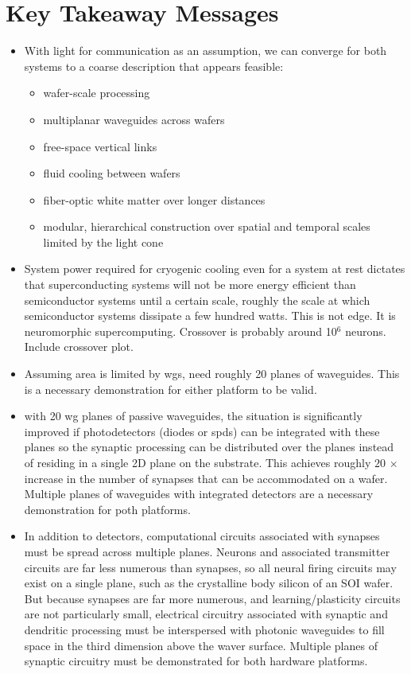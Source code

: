 \documentclass[onecolumn]{article}
\begin{document}
\section{Key Takeaway Messages}
\begin{itemize}

\item With light for communication as an assumption, we can converge for both systems to a coarse description that appears feasible:
\begin{itemize}
\item wafer-scale processing
\item multiplanar waveguides across wafers
\item free-space vertical links
\item fluid cooling between wafers
\item fiber-optic white matter over longer distances
\item modular, hierarchical construction over spatial and temporal scales limited by the light cone
\end{itemize}

\item System power required for cryogenic cooling even for a system at rest dictates that superconducting systems will not be more energy efficient than semiconductor systems until a certain scale, roughly the scale at which semiconductor systems dissipate a few hundred watts. This is not edge. It is neuromorphic supercomputing. Crossover is probably around 10$^6$ neurons. Include crossover plot.

\item Assuming area is limited by wgs, need roughly 20 planes of waveguides. This is a necessary demonstration for either platform to be valid.

\item with 20 wg planes of passive waveguides, the situation is significantly improved if photodetectors (diodes or spds) can be integrated with these planes so the synaptic processing can be distributed over the planes instead of residing in a single 2D plane on the substrate. This achieves roughly $20\,\times$ increase in the number of synapses that can be accommodated on a wafer. Multiple planes of waveguides with integrated detectors are a necessary demonstration for poth platforms.

\item In addition to detectors, computational circuits associated with synapses must be spread across multiple planes. Neurons and associated transmitter circuits are far less numerous than synapses, so all neural firing circuits may exist on a single plane, such as the crystalline body silicon of an SOI wafer. But because synapses are far more numerous, and learning/plasticity circuits are not particularly small, electrical circuitry associated with synaptic and dendritic processing must be interspersed with photonic waveguides to fill space in the third dimension above the waver surface. Multiple planes of synaptic circuitry must be demonstrated for both hardware platforms.


\end{itemize}
\end{document}
